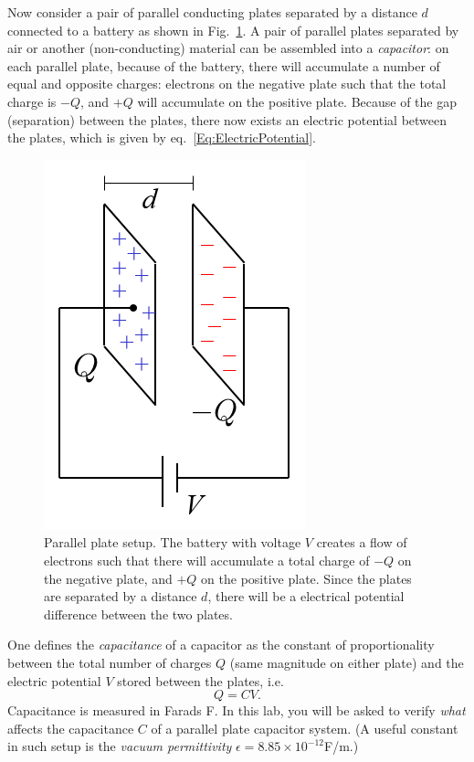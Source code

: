 \documentclass[12pt]{report}
\begin{document}
Now consider a pair of parallel conducting plates separated by a distance $d$ connected to a battery as shown in Fig.~\ref{Fig:ParallelPlates}. A pair of parallel plates separated by air or another (non-conducting) material can be assembled into a \textit{capacitor}: on each parallel plate, because of the battery, there will accumulate a number of equal and opposite charges: electrons on the negative plate such that the total charge is $-Q$, and $+Q$ will accumulate on the positive plate. Because of the gap (separation) between the plates, there now exists an electric potential between the plates, which is given by eq.~\eqref{Eq:ElectricPotential}.
\begin{figure}[h]
\centering
\includegraphics[scale=0.6]{lab1-parallel-plates.png}
\caption{Parallel plate setup. The battery with voltage $V$ creates a flow of electrons such that there will accumulate a total charge of $-Q$ on the negative plate, and $+Q$ on the positive plate. Since the plates are separated by a distance $d$, there will be a electrical potential difference between the two plates.}
\label{Fig:ParallelPlates}
\end{figure}

One defines the \textit{capacitance} of a capacitor as the constant of proportionality between the total number of charges $Q$ (same magnitude on either plate) and the electric potential $V$ stored between the plates, i.e. 
\begin{equation}
Q = C V.
\label{Eq:lab1-Q=CV}
\end{equation}
Capacitance is measured in Farads F.  In this lab, you will be asked to verify \textit{what} affects the capacitance $C$ of a parallel plate capacitor system. (A useful constant in such setup is the \textit{vacuum permittivity} $\epsilon = 8.85 \times 10^{-12}$F/m.)
\end{document}
